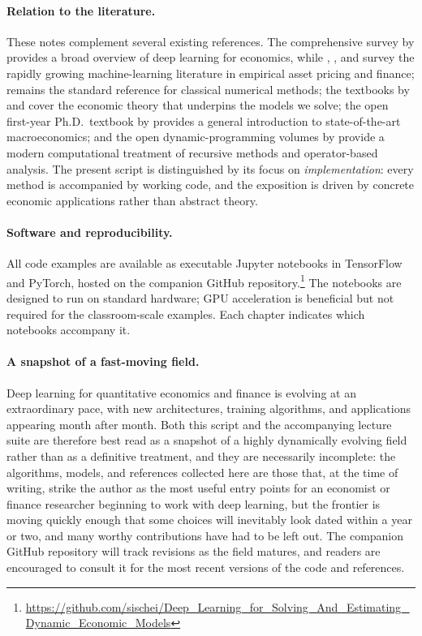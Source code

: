 \documentclass[11pt,a4paper]{report}
\begin{document}
\paragraph{Relation to the literature.}
These notes complement several existing references.  The comprehensive survey by \citet{fernandezvillaverde2024taming} provides a broad overview of deep learning for economics, while \citet{gukellyxiu2020}, \citet{nagel2021mlap}, and \citet{kellyxiu2023fml} survey the rapidly growing machine-learning literature in empirical asset pricing and finance; \citet{judd1998numerical} remains the standard reference for classical numerical methods; the textbooks by \citet{stokeylucas1989} and \citet{ljungqvist2018recursive} cover the economic theory that underpins the models we solve; the open first-year Ph.D.\ textbook by \citet{azzimontikrusellmckaymukoyama2026macro} provides a general introduction to state-of-the-art macroeconomics; and the open dynamic-programming volumes by \citet{sargentstachurski2026dp} provide a modern computational treatment of recursive methods and operator-based analysis.  The present script is distinguished by its focus on \emph{implementation}: every method is accompanied by working code, and the exposition is driven by concrete economic applications rather than abstract theory.

\paragraph{Software and reproducibility.}
All code examples are available as executable Jupyter notebooks in TensorFlow and PyTorch, hosted on the companion GitHub repository.\footnote{\url{https://github.com/sischei/Deep_Learning_for_Solving_And_Estimating_Dynamic_Economic_Models}}  The notebooks are designed to run on standard hardware; GPU acceleration is beneficial but not required for the classroom-scale examples.  Each chapter indicates which notebooks accompany it.

\paragraph{A snapshot of a fast-moving field.}
Deep learning for quantitative economics and finance is evolving at an extraordinary pace, with new architectures, training algorithms, and applications appearing month after month.  Both this script and the accompanying lecture suite are therefore best read as a snapshot of a highly dynamically evolving field rather than as a definitive treatment, and they are necessarily incomplete: the algorithms, models, and references collected here are those that, at the time of writing, strike the author as the most useful entry points for an economist or finance researcher beginning to work with deep learning, but the frontier is moving quickly enough that some choices will inevitably look dated within a year or two, and many worthy contributions have had to be left out.  The companion GitHub repository will track revisions as the field matures, and readers are encouraged to consult it for the most recent versions of the code and references.
\end{document}
